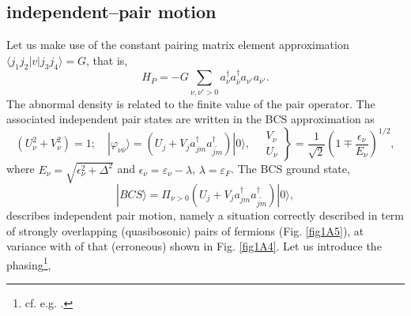 \subsection{independent--pair motion}\label{C1AppDS2}
Let us make use of the constant pairing matrix element approximation $\langle j_1j_2|v|j_3j_4\rangle=G$, that is, 
\begin{equation}
H_P=-G\sum_{\nu, \nu'>0}a^{\dagger}_\nu a^{\dagger}_{\bar\nu}a_{\nu'} a_{\bar\nu'}.
\end{equation}
 The abnormal density is related to the finite value of the pair operator. The associated independent pair states are written in the BCS approximation as
\begin{equation}
\left(U_\nu^2+V_\nu^2\right)=1;\quad |\varphi_{\nu\bar\nu}\rangle=\left(U_j+V_ja^\dagger_{jm}a^\dagger_{\tilde{jm}}\right)|0\rangle,\quad\left.\begin{array}{c}
V_\nu \\ 
U_\nu
\end{array}\right\}=\frac{1}{\sqrt{2}}\left(1\mp\frac{\epsilon_\nu}{E_\nu}\right)^{1/2},
\end{equation}
where $E_\nu=\sqrt{\epsilon_\nu^2+\Delta^2}$ and $\epsilon_\nu=\varepsilon_\nu-\lambda$, $\lambda=\varepsilon_F$.
The BCS ground state,
\begin{equation}
|BCS\rangle=\Pi_{\nu>0}\left(U_j+V_ja^\dagger_{jm}a^\dagger_{\tilde{jm}}\right)|0\rangle,
\end{equation}
describes independent pair motion, namely a situation correctly described in term of strongly overlapping (quasibosonic) pairs of fermions (Fig. \ref{fig1A5}), at variance with of that (erroneous) shown in Fig. \ref{fig1A4}.
Let us introduce the phasing\footnote{cf. e.g. \cite{Schrieffer:73}.}, 


